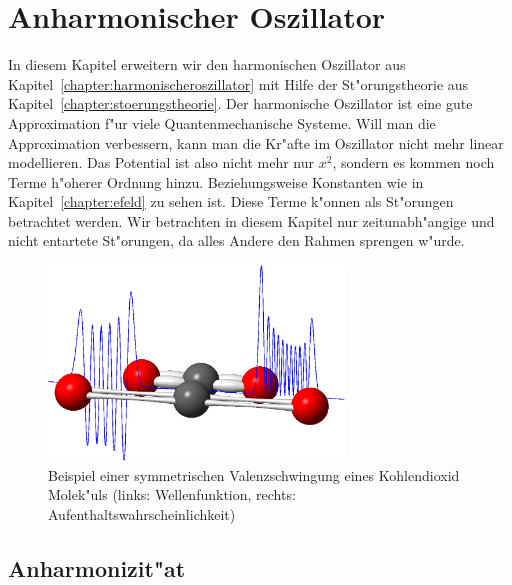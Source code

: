 \chapter{Anharmonischer Oszillator\label{chapter:anharmonisch}}
\begin{refsection}

In diesem Kapitel erweitern wir den harmonischen Oszillator aus
Kapitel~\ref{chapter:harmonischeroszillator} mit Hilfe der St"orungstheorie aus
Kapitel~\ref{chapter:stoerungstheorie}.
Der harmonische Oszillator ist eine gute Approximation f"ur viele
Quantenmechanische Systeme.
Will man die Approximation verbessern,
kann man die Kr"afte im Oszillator nicht mehr linear modellieren.
Das Potential ist also nicht mehr nur $x^2$,
sondern es kommen noch Terme h"oherer Ordnung hinzu.
Beziehungsweise Konstanten wie in Kapitel~\ref{chapter:efeld} zu sehen ist.
Diese Terme k"onnen als St"orungen betrachtet werden.
Wir betrachten in diesem Kapitel nur zeitunabh"angige und nicht entartete
St"orungen, da alles Andere den Rahmen sprengen w"urde.

\begin{figure}	%
\centering
\includegraphics[width=0.7\textwidth]{anharmonisch/images/Titelbild.png}
\caption{Beispiel einer symmetrischen Valenzschwingung eines Kohlendioxid Molek"uls
(links: Wellenfunktion, rechts: Aufenthaltswahrscheinlichkeit)
\label{skript:Titelbild}}
\end{figure}

\section{Anharmonizit"at}


\end{refsection}
